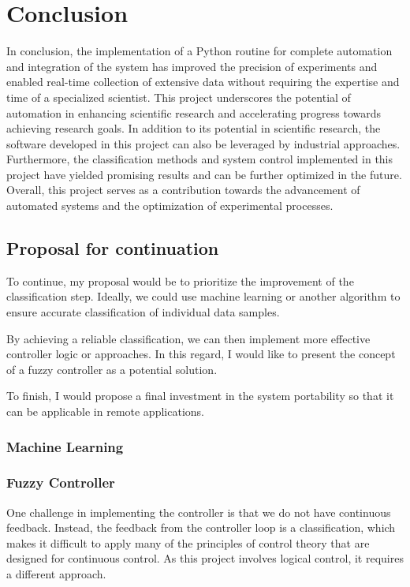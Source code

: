 \chapter{Conclusion}
\label{chap:conclusion}

In conclusion, the implementation of a Python routine for complete automation and integration of the system has improved the precision of experiments and enabled real-time collection of extensive data without requiring the expertise and time of a specialized scientist. 
This project underscores the potential of automation in enhancing scientific research and accelerating progress towards achieving research goals.
In addition to its potential in scientific research, the software developed in this project can also be leveraged by industrial approaches. 
Furthermore, the classification methods and system control implemented in this project have yielded promising results and can be further optimized in the future. Overall, this project serves as a contribution towards the advancement of automated systems and the optimization of experimental processes.

\section{Proposal for continuation}

To continue, my proposal would be to prioritize the improvement of the classification step. 
Ideally, we could use machine learning or another algorithm to ensure accurate classification of individual data samples.

By achieving a reliable classification, we can then implement more effective controller logic or approaches. 
In this regard, I would like to present the concept of a fuzzy controller as a potential solution.

To finish, I would propose a final investment in the system portability so that it can be applicable in remote applications.

\subsection{Machine Learning}

\subsection{Fuzzy Controller}

        One challenge in implementing the controller is that we do not have continuous feedback. 
        Instead, the feedback from the controller loop is a classification, which makes it difficult to apply many of the principles of control theory that are designed for continuous control. 
        As this project involves logical control, it requires a different approach. 
        
